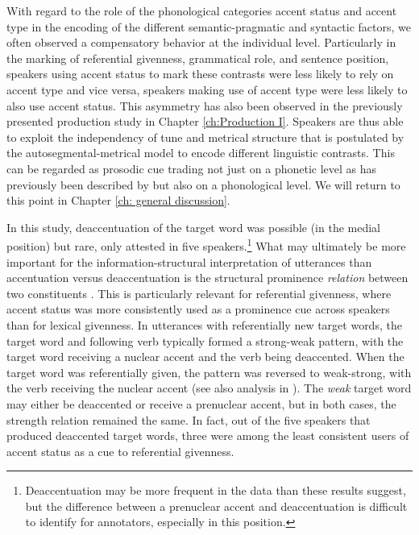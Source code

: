 With regard to the role of the phonological categories accent status and accent type in the encoding of the different semantic-pragmatic and syntactic factors, we often observed a compensatory behavior at the individual level. Particularly in the marking of referential givenness, grammatical role, and sentence position, speakers using accent status to mark these contrasts were less likely to rely on accent type and vice versa, speakers making use of accent type were less likely to also use accent status. This asymmetry has also been observed in the previously presented production study in Chapter \ref{ch:Production I}. Speakers are thus able to exploit the independency of tune and metrical structure that is postulated by the autosegmental-metrical model \citep[e.g.,][]{laddIntonationalPhonology2008} to encode different linguistic contrasts. This can be regarded as prosodic cue trading not just on a phonetic level as has previously been described by \citet{severijnenYourVOORnaamNot2024} but also on a phonological level. We will return to this point in Chapter \ref{ch: general discussion}.

In this study, deaccentuation of the target word was possible (in the medial position) but rare, only attested in five speakers.\footnote{Deaccentuation may be more frequent in the data than these results suggest, but the difference between a prenuclear accent and deaccentuation is difficult to identify for annotators, especially in this position.} What may ultimately be more important for the information-structural interpretation of utterances than accentuation versus deaccentuation is the structural prominence \textit{relation} between two constituents \citep[e.g.,][]{libermanIntonationalSystemEnglish1975, laddIntonationalPhonology2008, laddProsodicProminenceLanguages2023}. This is particularly relevant for referential givenness, where accent status was more consistently used as a prominence cue across speakers than for lexical givenness. In utterances with referentially new target words, the target word and following verb typically formed a strong-weak pattern, with the target word receiving a nuclear accent and the verb being deaccented. When the target word was referentially given, the pattern was reversed to weak-strong, with the verb receiving the nuclear accent (see also analysis in \citealt{baumannBoostingInhibitingHow2024}). The \textit{weak} target word may either be deaccented or receive a prenuclear accent, but in both cases, the strength relation remained the same. In fact, out of the five speakers that produced deaccented target words, three were among the least consistent users of accent status as a cue to referential givenness.

